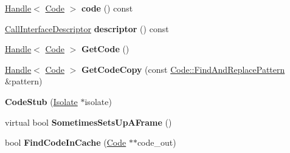 \begin{DoxyCompactItemize}
\item 
\hyperlink{classv8_1_1internal_1_1_handle}{Handle}$<$ \hyperlink{classv8_1_1internal_1_1_code}{Code} $>$ {\bfseries code} () const \hypertarget{classv8_1_1internal_1_1_b_a_s_e___e_m_b_e_d_d_e_d_a97a8181c994b8e3528a7a67118f67023}{}\label{classv8_1_1internal_1_1_b_a_s_e___e_m_b_e_d_d_e_d_a97a8181c994b8e3528a7a67118f67023}

\item 
\hyperlink{classv8_1_1internal_1_1_call_interface_descriptor}{Call\+Interface\+Descriptor} {\bfseries descriptor} () const \hypertarget{classv8_1_1internal_1_1_b_a_s_e___e_m_b_e_d_d_e_d_ab90116459b3bbb4cce4733d39204dbfa}{}\label{classv8_1_1internal_1_1_b_a_s_e___e_m_b_e_d_d_e_d_ab90116459b3bbb4cce4733d39204dbfa}

\item 
\hyperlink{classv8_1_1internal_1_1_handle}{Handle}$<$ \hyperlink{classv8_1_1internal_1_1_code}{Code} $>$ {\bfseries Get\+Code} ()\hypertarget{classv8_1_1internal_1_1_b_a_s_e___e_m_b_e_d_d_e_d_a054f3f99b9bd3b1d9148d916d143f88f}{}\label{classv8_1_1internal_1_1_b_a_s_e___e_m_b_e_d_d_e_d_a054f3f99b9bd3b1d9148d916d143f88f}

\item 
\hyperlink{classv8_1_1internal_1_1_handle}{Handle}$<$ \hyperlink{classv8_1_1internal_1_1_code}{Code} $>$ {\bfseries Get\+Code\+Copy} (const \hyperlink{classv8_1_1internal_1_1_code_1_1_find_and_replace_pattern}{Code\+::\+Find\+And\+Replace\+Pattern} \&pattern)\hypertarget{classv8_1_1internal_1_1_b_a_s_e___e_m_b_e_d_d_e_d_aa540c7c888d4e8b1fe7e1f73ed834f99}{}\label{classv8_1_1internal_1_1_b_a_s_e___e_m_b_e_d_d_e_d_aa540c7c888d4e8b1fe7e1f73ed834f99}

\item 
{\bfseries Code\+Stub} (\hyperlink{classv8_1_1internal_1_1_isolate}{Isolate} $\ast$isolate)\hypertarget{classv8_1_1internal_1_1_b_a_s_e___e_m_b_e_d_d_e_d_a0ea89142f84fb46b3c1b2ac421616e38}{}\label{classv8_1_1internal_1_1_b_a_s_e___e_m_b_e_d_d_e_d_a0ea89142f84fb46b3c1b2ac421616e38}

\item 
virtual bool {\bfseries Sometimes\+Sets\+Up\+A\+Frame} ()\hypertarget{classv8_1_1internal_1_1_b_a_s_e___e_m_b_e_d_d_e_d_a10d9ceed0def40920ccc9fc9a487a24a}{}\label{classv8_1_1internal_1_1_b_a_s_e___e_m_b_e_d_d_e_d_a10d9ceed0def40920ccc9fc9a487a24a}

\item 
bool {\bfseries Find\+Code\+In\+Cache} (\hyperlink{classv8_1_1internal_1_1_code}{Code} $\ast$$\ast$code\+\_\+out)\hypertarget{classv8_1_1internal_1_1_b_a_s_e___e_m_b_e_d_d_e_d_ac3f31a3ba49bd8d584a31d4e0a8a38f9}{}\label{classv8_1_1internal_1_1_b_a_s_e___e_m_b_e_d_d_e_d_ac3f31a3ba49bd8d584a31d4e0a8a38f9}


\end{DoxyCompactItemize}
